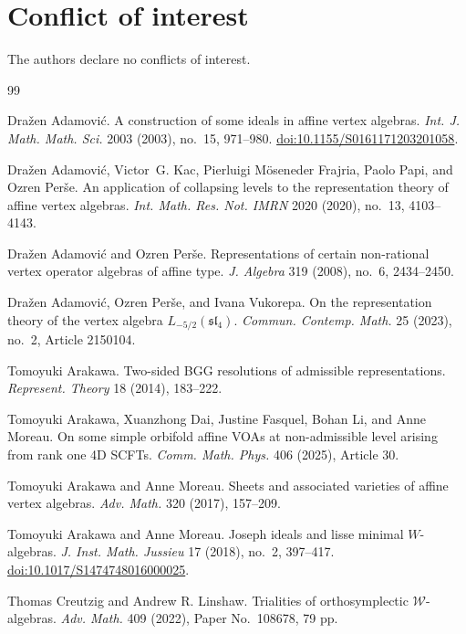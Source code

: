 \documentclass[11pt,a4paper]{amsart}
\theoremstyle{plain}
\numberwithin{equation}{section}
\begin{document}
\section*{Conflict of interest}
The authors declare no conflicts of interest.
\begin{thebibliography}{99}

Dra\v{z}en Adamovi\'c.
\newblock A construction of some ideals in affine vertex algebras.
\newblock \emph{Int. J. Math. Math. Sci.} 2003 (2003), no.~15, 971--980.
\newblock \href{https://doi.org/10.1155/S0161171203201058}
{doi:10.1155/S0161171203201058}.

Dra{\v{z}}en Adamovi{\'c}, Victor~G. Kac, Pierluigi M{\"o}seneder Frajria,
Paolo Papi, and Ozren Per{\v{s}}e.
\newblock An application of collapsing levels to the representation theory of
affine vertex algebras.
\newblock \emph{Int. Math. Res. Not. IMRN} 2020 (2020), no.~13, 4103--4143.

Dra{\v{z}}en Adamovi{\'c} and Ozren Per{\v{s}}e.
\newblock Representations of certain non-rational vertex operator algebras of
affine type.
\newblock \emph{J. Algebra} 319 (2008), no.~6, 2434--2450.

Dra{\v{z}}en Adamovi{\'c}, Ozren Per{\v{s}}e, and Ivana Vukorepa.
\newblock On the representation theory of the vertex algebra
$L_{-5/2}(\mathfrak{sl}_4)$.
\newblock \emph{Commun. Contemp. Math.} 25 (2023), no.~2, Article 2150104.

Tomoyuki Arakawa.
\newblock Two-sided BGG resolutions of admissible representations.
\newblock \emph{Represent. Theory} 18 (2014), 183--222.

Tomoyuki Arakawa, Xuanzhong Dai, Justine Fasquel, Bohan Li, and Anne Moreau.
\newblock On some simple orbifold affine {VOA}s at non-admissible level
arising from rank one 4{D} {SCFT}s.
\newblock \emph{Comm. Math. Phys.} 406 (2025), Article 30.

Tomoyuki Arakawa and Anne Moreau.
\newblock Sheets and associated varieties of affine vertex algebras.
\newblock \emph{Adv. Math.} 320 (2017), 157--209.

Tomoyuki Arakawa and Anne Moreau.
\newblock Joseph ideals and lisse minimal \(W\)-algebras.
\newblock \emph{J. Inst. Math. Jussieu}
17 (2018), no.~2, 397--417.
\newblock \href{https://doi.org/10.1017/S1474748016000025}
{doi:10.1017/S1474748016000025}.

Thomas Creutzig and Andrew R. Linshaw.
\newblock Trialities of orthosymplectic $\mathcal W$-algebras.
\newblock \emph{Adv. Math.} 409 (2022), Paper No.~108678, 79 pp.


\end{thebibliography}
\end{document}
